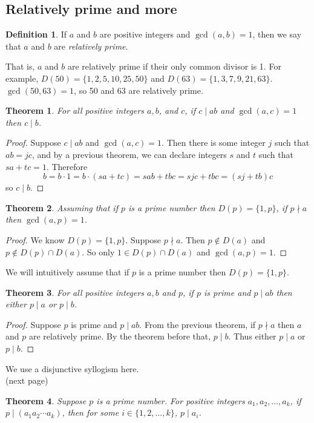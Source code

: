 \documentclass{report}
\newtheorem*{theorem}{Theorem}
\theoremstyle{definition}
\newtheorem*{definition}{Definition}
\begin{document}
\subsection{Relatively prime and more}
\begin{definition}
If $a$ and $b$ are positive integers and $\gcd(a,b)=1$, then we say that $a$ and $b$ are \textit{relatively prime}.
\end{definition}
\noindent That is, $a$ and $b$ are relatively prime if their only common divisor is 1. For example, $D(50)=\{1,2,5,10,25,50\}$ and $D(63)=\{1,3,7,9,21,63\}$. $\gcd(50,63)=1$, so 50 and 63 are
relatively prime.
\begin{theorem}
For all positive integers $a,b$, and $c$, if $c\mid ab$ and $\gcd(a,c)=1$ then $c\mid b$.
\end{theorem}
\begin{proof}
Suppose $c\mid ab$ and $\gcd(a,c)=1$. Then there is some integer $j$ such that $ab=jc$, and by a previous theorem, we can declare integers $s$ and $t$ such that $sa+tc=1$. Therefore
\begin{equation*}
b=b\cdot1=b\cdot(sa+tc)=sab+tbc=sjc+tbc=(sj+tb)c
\end{equation*}
so $c\mid b$.
\end{proof}
\begin{theorem}
Assuming that if $p$ is a prime number then $D(p)=\{1,p\}$, if $p\nmid a$ then $\gcd(a,p)=1$.
\end{theorem}
\begin{proof}
We know $D(p)=\{1,p\}$. Suppose $p\nmid a$. Then $p\notin D(a)$ and $p\notin D(p)\cap D(a)$. So only $1\in D(p)\cap D(a)$ and $\gcd(a,p)=1$.
\end{proof}
\noindent We will intuitively assume that if $p$ is a prime number then $D(p)=\{1,p\}$.
\begin{theorem}
For all positive integers $a,b$ and $p$, if $p$ is prime and $p\mid ab$ then either $p\mid a$ or $p\mid b$.
\end{theorem}
\begin{proof}
Suppose $p$ is prime and $p\mid ab$. From the previous theorem, if $p\nmid a$ then $a$ and $p$ are relatively prime. By the theorem before that, $p\mid b$. Thus either $p\mid a$ or $p\mid b$.
\end{proof}
\noindent We use a disjunctive syllogism here.\\
(next page)\newpage
\begin{theorem}
Suppose $p$ is a prime number. For positive integers $a_1,a_2,\ldots,a_k$, if $p\mid(a_1a_2\cdots a_k)$, then for some $i\in\{1,2,\ldots,k\}$, $p\mid a_i$.
\end{theorem}
\end{document}
